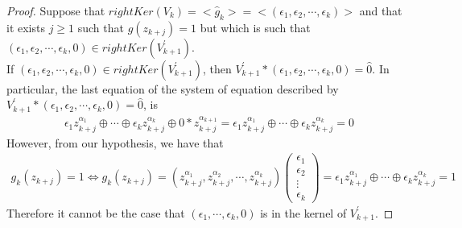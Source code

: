 \documentclass[11pt]{llncs}
\begin{document}
\begin{proof}
    Suppose that $rightKer(V_k) = <\hat{g}_k> = <(\epsilon_1,\epsilon_2, \cdots, \epsilon_k )>$ and that it exists $j\geq 1$ such that $g(z_{k+j}) = 1$ but which is such that $(\epsilon_1, \epsilon_2, \cdots, \epsilon_k, 0) \in rightKer(V^{'}_{k+1})$.\\
    If $(\epsilon_1, \epsilon_2, \cdots, \epsilon_k, 0) \in rightKer(V^{'}_{k+1})$, then $V^{'}_{k+1}* (\epsilon_1, \epsilon_2, \cdots, \epsilon_k, 0)= \hat{0}$. In particular, the last equation of the system of equation described by $V^{'}_{k+1}* (\epsilon_1, \epsilon_2, \cdots, \epsilon_k, 0)= \hat{0}$, is 
    \begin{align}
        \epsilon_1z_{k+j}^{\alpha_1} \oplus \cdots \oplus\epsilon_k z_{k+j}^{\alpha_k} \oplus 0*z_{k+j}^{\alpha_{k+1}} =  \epsilon_1z_{k+j}^{\alpha_1} \oplus \cdots \oplus \epsilon_k z_{k+j}^{\alpha_k} = 0
    \end{align}
    However, from our hypothesis, we have that
    \begin{align*}
        g_k(z_{k+j}) =  1 \iff g_k(z_{k+j}) = (z_{k+j}^{\alpha_1} ,z_{k+j}^{\alpha_2}, \cdots ,z_{k+j}^{\alpha_k}) \begin{pmatrix}
            \epsilon_1\\
            \epsilon_2\\
            \vdots\\
            \epsilon_k
        \end{pmatrix}
        = \epsilon_1z_{k+j}^{\alpha_1} \oplus \cdots \oplus \epsilon_k z_{k+j}^{\alpha_k} = 1
    \end{align*}
    Therefore it cannot be the case that $(\epsilon_1, \cdots, \epsilon_k, 0)$ is in the kernel of $V^{'}_{k+1}$.
\end{proof}
\end{document}
